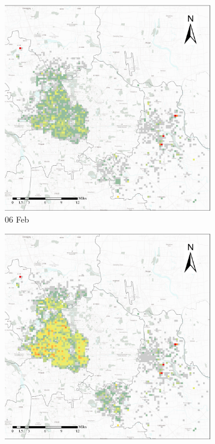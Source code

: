 \documentclass[preprints,ijgi,submit,moreauthors]{Definitions/mdpi}
\begin{document}
\begin{figure}[H]
    \vspace{6pt}
    \begin{subfigure}{.23\textwidth}
        \includegraphics[width=\textwidth]{Figures/Overall_spatial_patterns/FN5_D2020_02_06.eps}
        \caption{06 Feb}
    \end{subfigure}
    \begin{subfigure}{.23\textwidth}
        \includegraphics[width=\textwidth]{Figures/Overall_spatial_patterns/FN5_D2020_02_10.eps}

\end{subfigure}
\end{figure}
\end{document}
